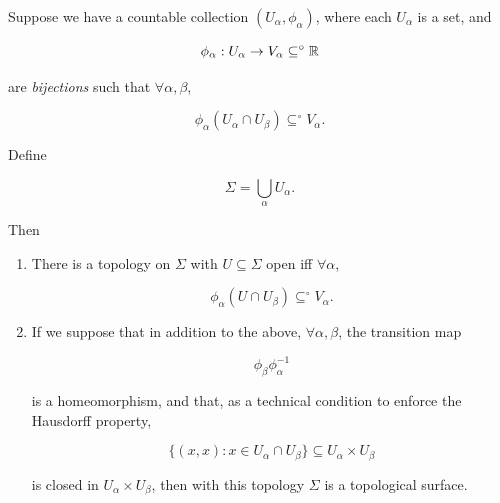 \documentclass[11pt]{scrartcl}
\begin{document}
\begin{proposition}

Suppose we have a countable collection $(U_\alpha, \phi_\alpha)$, where each $U_\alpha$ is a set, and

\begin{equation}
    \phi_\alpha : U_\alpha \rightarrow V_\alpha \subseteq^\circ \mathbb R
\end{equation}

are \emph{bijections} such that $\forall \alpha, \beta$,

\begin{equation}
    \phi_\alpha(U_\alpha \cap U_\beta) \subseteq^\circ V_\alpha.
\end{equation}

Define

\begin{equation}
    \Sigma = \bigcup_\alpha U_\alpha.
\end{equation}

Then 

\begin{enumerate}
    \item There is a topology on $\Sigma$ with $U \subseteq \Sigma$ open iff $\forall \alpha$, 
    
    \begin{equation}
        \phi_\alpha(U \cap U_\beta) \subseteq^\circ V_\alpha.
    \end{equation}
    
    \item If we suppose that in addition to the above, $\forall \alpha, \beta$, the transition map 

    \begin{equation}
        \phi_\beta \phi_\alpha^{-1}
    \end{equation}

    is a homeomorphism, and that, as a technical condition to enforce the Hausdorff property,

    \begin{equation}
        \{ (x,x) : x \in U_\alpha \cap U_\beta \} \subseteq U_\alpha \times U_\beta 
    \end{equation}

    is closed in $U_\alpha \times U_\beta$, then with this topology $\Sigma$ is a topological surface.
\end{enumerate}

\label{daniel topology}
\end{proposition}
\end{document}

